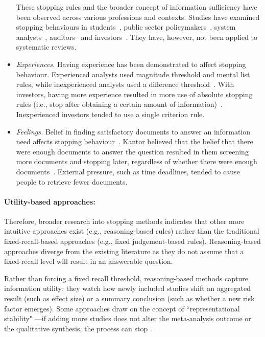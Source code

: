 \documentclass[10pt,oneside]{book}
\begin{document}
\begin{itemize}
    These stopping rules and the broader concept of information sufficiency have been observed across various professions and contexts. Studies have examined stopping behaviours in students~\cite{browne_stopping_2005, browne_cognitive_2007, dedema_examination_2019, nickles_judgment-based_1995, creighton_university_cognitive_2017, gerhart_generalizing_2020}, public sector policymakers~\cite{berryman_what_2006}, system analysts~\cite{pitts_stopping_2004}, auditors~\cite{poziemski_when_2019} and investors~\cite{pennington_how_2016}. They have, however, not been applied to systematic reviews.
 
    \item \emph{Experiences.} Having experience has been demonstrated to affect stopping behaviour. Experienced analysts used magnitude threshold and mental list rules, while inexperienced analysts used a difference threshold~\cite{pitts_stopping_2004}. With investors, having more experience resulted in more use of absolute stopping rules (i.e., stop after obtaining a certain amount of information)~\cite{pennington_how_2016}. Inexperienced investors tended to use a single criterion rule.

    \item \emph{Feelings.} Belief in finding satisfactory documents to answer an information need affects stopping behaviour~\cite{wu_online_2014}. Kantor believed that the belief that there were enough documents to answer the question resulted in them screening more documents and stopping later, regardless of whether there were enough documents~\cite{kantor_model_1987}. External pressure, such as time deadlines, tended to cause people to retrieve fewer documents.

\end{itemize}

\paragraph{Utility-based approaches:}
Therefore, broader research into stopping methods indicates that other more intuitive approaches exist (e.g., reasoning-based rules) rather than the traditional fixed-recall-based approaches (e.g., fixed judgement-based rules). Reasoning-based approaches diverge from the existing literature as they do not assume that a fixed-recall level will result in an answerable question.

Rather than forcing a fixed recall threshold, reasoning-based methods capture information utility: they watch how newly included studies shift an aggregated result (such as effect size) or a summary conclusion (such as whether a new risk factor emerges). Some approaches draw on the concept of ``representational stability" \cite{nickles_judgment-based_1995}—if adding more studies does not alter the meta-analysis outcome or the qualitative synthesis, the process can stop \cite{ilani_analysis_2024}.
\end{document}
